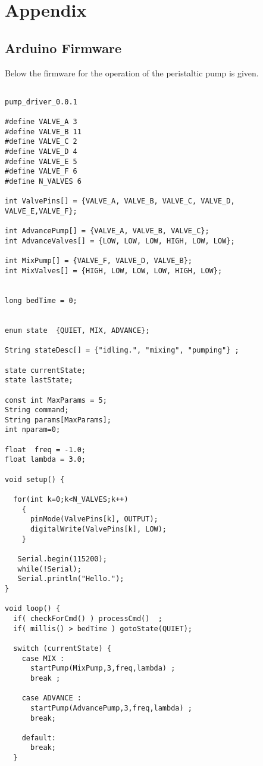 

\chapter{Appendix} \label{Chapter:Appendix}


\section{Arduino Firmware}

Below the firmware for the operation of the peristaltic pump is given.

\begin{lstlisting}

pump_driver_0.0.1

#define VALVE_A 3
#define VALVE_B 11
#define VALVE_C 2
#define VALVE_D 4
#define VALVE_E 5
#define VALVE_F 6
#define N_VALVES 6

int ValvePins[] = {VALVE_A, VALVE_B, VALVE_C, VALVE_D, VALVE_E,VALVE_F};

int AdvancePump[] = {VALVE_A, VALVE_B, VALVE_C};
int AdvanceValves[] = {LOW, LOW, LOW, HIGH, LOW, LOW};

int MixPump[] = {VALVE_F, VALVE_D, VALVE_B};
int MixValves[] = {HIGH, LOW, LOW, LOW, HIGH, LOW};


long bedTime = 0;


enum state  {QUIET, MIX, ADVANCE};

String stateDesc[] = {"idling.", "mixing", "pumping"} ;

state currentState;
state lastState;

const int MaxParams = 5;
String command;
String params[MaxParams];
int nparam=0;

float  freq = -1.0;
float lambda = 3.0;

void setup() {

  for(int k=0;k<N_VALVES;k++)
    {
      pinMode(ValvePins[k], OUTPUT);
      digitalWrite(ValvePins[k], LOW);
    }

   Serial.begin(115200);
   while(!Serial);
   Serial.println("Hello.");
}

void loop() {
  if( checkForCmd() ) processCmd()  ;
  if( millis() > bedTime ) gotoState(QUIET);

  switch (currentState) {
    case MIX :
      startPump(MixPump,3,freq,lambda) ;
      break ;

    case ADVANCE :
      startPump(AdvancePump,3,freq,lambda) ;
      break;

    default:
      break;
  }


\end{lstlisting}
